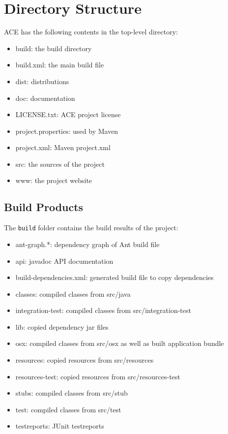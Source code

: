 \documentclass[11pt,a4paper]{article}
\begin{document}
\section{Directory Structure}
ACE has the following contents in the top-level directory:

\begin{itemize}
 \item build: the build directory
 \item build.xml: the main build file
 \item dist: distributions
 \item doc: documentation
 \item LICENSE.txt: ACE project license
 \item project.properties: used by Maven
 \item project.xml: Maven project.xml
 \item src: the sources of the project
 \item www: the project website
\end{itemize}

\subsection{Build Products}
The \texttt{build} folder contains the build results of the project:

\begin{itemize}
 \item ant-graph.*: dependency graph of Ant build file
 \item api: javadoc API documentation
 \item build-dependencies.xml: generated build file to copy dependencies
 \item classes: compiled classes from src/java
 \item integration-test: compiled classes from src/integration-test
 \item lib: copied dependency jar files
 \item osx: compiled classes from src/osx as well as built application bundle
 \item resources: copied resources from src/resources
 \item resources-test: copied resources from src/resources-test
 \item stubs: compiled classes from src/stub
 \item test: compiled classes from src/test
 \item testreports: JUnit testreports
\end{itemize}
\end{document}
